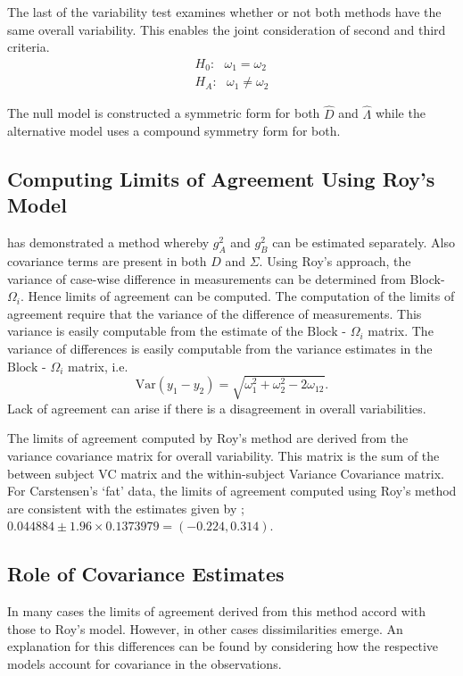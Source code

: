\documentclass[12pt, a4paper]{report}
\theoremstyle{plain}
\theoremstyle{definition}
\theoremstyle{remark}
\begin{document}
	The last of the variability test examines whether or not both methods have the same overall variability. This enables the joint consideration of second and third criteria.
	\begin{eqnarray*}
		H_{0}: \mbox{ }\omega_{1}  = \omega_{2} \\
		H_{A}: \mbox{ }\omega_{1}  \neq \omega_{2}
	\end{eqnarray*}
	
	The null model is constructed a symmetric form for both ${\hat{D}}$ and ${\hat{\Lambda}}$ while the alternative model uses a compound symmetry form for both.
	
	
	
	
	
	
	\subsection{Computing Limits of Agreement Using Roy's Model}
	\citet{ARoy2009} has demonstrated a method whereby $g^2_{A}$ and $g^2_{B}$ can be estimated separately. Also covariance terms are present in both ${D}$ and ${\Sigma}$. Using Roy's approach, the variance of case-wise difference in measurements can be determined from Block-${\Omega}_{i}$. Hence limits of agreement can be computed. The computation of the limits of agreement require that the variance of the difference of measurements. This variance is easily computable from the estimate of the ${\mbox{Block - } \Omega_{i}}$ matrix.
	The variance of differences is easily computable from the variance estimates in the ${\mbox{Block - } \Omega_{i}}$ matrix, i.e.
	\[
	\mathrm{Var}(y_1 - y_2) = \sqrt{ \omega^2_1 + \omega^2_2 - 2\omega_{12}}.
	\]	
	Lack of agreement can arise if there is a disagreement in overall variabilities. 
	
	The limits of agreement computed by Roy's method are derived from the variance covariance matrix for overall variability.
	This matrix is the sum of the between subject VC matrix and the within-subject Variance Covariance matrix.
	For Carstensen's `fat' data, the limits of agreement computed using Roy's
	method are consistent with the estimates given by \citet{BXC2008}; $0.044884  \pm 1.96 \times  0.1373979 = (-0.224,  0.314).$
	
	
	
	
\subsection{Role of Covariance Estimates}
In many cases the limits of agreement derived from this method accord with those to Roy's model. However, in other cases dissimilarities emerge. An explanation for this differences can be found by considering how the respective models account for covariance in the observations. 
	
\end{document}
